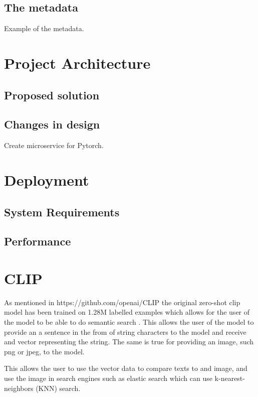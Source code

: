 \documentclass[article, 10pt]{article}
\begin{document}
\subsection{The metadata}
Example of the metadata.

\section{Project Architecture}

\subsection{Proposed solution}

\subsection{Changes in design}
Create microservice for Pytorch.

\section{Deployment}

\subsection{System Requirements}

\subsection{Performance}

\section{CLIP}
As mentioned in https://github.com/openai/CLIP the original zero-shot clip model has been trained on 1.28M labelled examples which allows for the user of the model to be able to do semantic search \cite{OpenAI}. This allows the user of the model to provide an a sentence in the from of string characters to the model and receive and vector representing the string. The same is true for providing an image, such png or jpeg, to the model. 

This allows the user to use the vector data to compare texts to and image, and use the image in search engines such as elastic search which can use  k-nearest-neighbors (KNN) search. 
\end{document}
